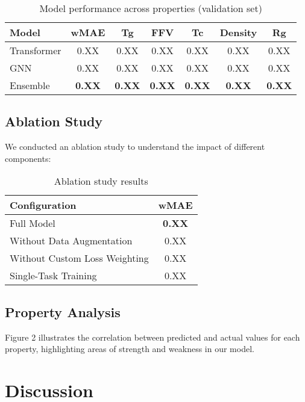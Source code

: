 \documentclass[10pt,twocolumn,letterpaper]{article}
\begin{document}
\begin{table}[h]
\centering
\begin{tabular}{lcccccc}
\toprule
\textbf{Model} & \textbf{wMAE} & \textbf{Tg} & \textbf{FFV} & \textbf{Tc} & \textbf{Density} & \textbf{Rg} \\
\midrule
Transformer & 0.XX & 0.XX & 0.XX & 0.XX & 0.XX & 0.XX \\
GNN & 0.XX & 0.XX & 0.XX & 0.XX & 0.XX & 0.XX \\
Ensemble & \textbf{0.XX} & \textbf{0.XX} & \textbf{0.XX} & \textbf{0.XX} & \textbf{0.XX} & \textbf{0.XX} \\
\bottomrule
\end{tabular}
\caption{Model performance across properties (validation set)}
\label{tab:model_performance}
\end{table}

\subsection{Ablation Study}

We conducted an ablation study to understand the impact of different components:

\begin{table}[h]
\centering
\begin{tabular}{lc}
\toprule
\textbf{Configuration} & \textbf{wMAE} \\
\midrule
Full Model & \textbf{0.XX} \\
Without Data Augmentation & 0.XX \\
Without Custom Loss Weighting & 0.XX \\
Single-Task Training & 0.XX \\
\bottomrule
\end{tabular}
\caption{Ablation study results}
\label{tab:ablation}
\end{table}

\subsection{Property Analysis}

Figure 2 illustrates the correlation between predicted and actual values for each property, highlighting areas of strength and weakness in our model.

\section{Discussion}
\end{document}
